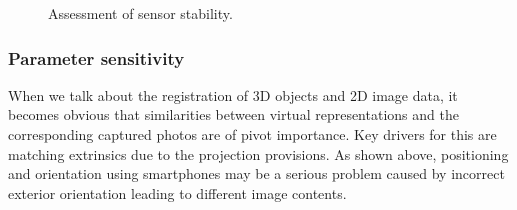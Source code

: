 \documentclass[review]{elsarticle}
\begin{document}
\begin{figure}[htbp!]
\begin{center}
	 	\begin{minipage}{\columnwidth}
	 		\centering
	 	\end{minipage} 
	 	\begin{minipage}{\columnwidth}
	 		\centering
	 	\end{minipage}
		
		\caption{Assessment of sensor stability.}
		\label{fig:sensor_sensi:imu_sensor_stabi_s8_nex5}
\end{center}
\end{figure}













\subsubsection{Parameter sensitivity}
\label{sec:technology:sensors:sensitivity}
When we talk about the registration of 3D objects and 2D image data, it becomes obvious that similarities between virtual representations and the corresponding captured photos are of pivot importance. Key drivers for this are matching extrinsics due to the projection provisions. As shown above, positioning and orientation using smartphones may be a serious problem caused by incorrect exterior orientation leading to different image contents. 
\end{document}
